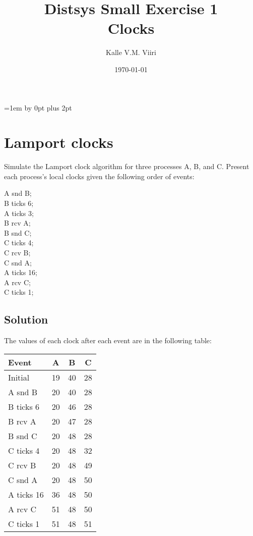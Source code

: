 \documentclass[12pt,a4paper,titlepage]{article}
\title{Distsys Small Exercise 1 \\ Clocks \vspace{0.5em}}
\author{Kalle V.M. Viiri}
\date{\today}
\begin{document}
\setcounter{page}{1}
\parskip=1em \advance\parskip by 0pt plus 2pt

\maketitle

\section{Lamport clocks}

Simulate the Lamport clock algorithm for three processes A,  B, and C. Present each process's local clocks given the following order of events:

A snd B;\\
B ticks 6;\\
A ticks 3;\\
B rcv A;\\
B snd C;\\
C ticks 4;\\
C rcv B;\\
C snd A;\\
A ticks 16;\\
A rcv C;\\
C ticks 1;\\

\subsection{Solution}

The values of each clock after each event are in the following table:\\

\begin{tabular}{ | l | c | c | c |} \hline
\textbf{Event} & \textbf{A} & \textbf{B} & \textbf{C} \\ \hline
Initial & 19 & 40 & 28 \\ \hline
A snd B & 20 & 40 & 28 \\ \hline
B ticks 6 & 20 & 46 & 28 \\ \hline
B rcv A & 20 & 47 & 28 \\ \hline
B snd C & 20 & 48 & 28 \\ \hline
C ticks 4 & 20 & 48 & 32 \\ \hline
C rcv B & 20 & 48 & 49 \\ \hline
C snd A & 20 & 48 & 50 \\ \hline
A ticks 16 & 36 & 48 & 50 \\ \hline
A rcv C & 51 & 48 & 50 \\ \hline
C ticks 1 & 51 & 48 & 51\\ \hline
\end{tabular}
\end{document}
